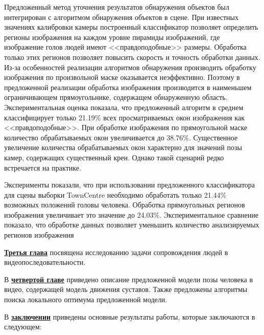 Предложенный метод уточнения результатов обнаружения объектов был интегрирован с алгоритмом обнаружения объектов в сцене. При известных значениях калибровки камеры построенный классификатор позволяет определить регионы изображения на каждом уровне пирамиды изображений, где изображение голов людей имеют <<правдоподобные>> размеры. Обработка только этих регионов позволяет повысить скорость и точность обработки данных. Из-за особенностей реализации алгоритмов обнаружения производить обработку изображения по произвольной маске оказывается неэффективно. Поэтому в предложенной реализации обработка изображения производится в наименьшем ограничивающем прямоугольнике, содержащем обнаруженную область. Экспериментальная оценка показала, что предложенный алгоритм в среднем классифицирует только 21.19\% всех просматриваемых окон изображения как <<правдоподобные>>. При обработке изображения по прямоугольной маске количество обрабатываемых окон увеличивается до 38.76\%. Существенное увеличение количества обрабатываемых окон характерно для значений позы камер, содержащих существенный крен. Однако такой сценарий редко встречается на практике.

Эксперименты показали, что при использовании предложенного классификатора для сцены выборки TownCentre \cite{benfold2011stable} необходимо обработать только 21.44\% возможных положений головы человека. Обработка прямоугольных регионов изображения увеличивает это значение до 24.03\%. Экспериментальное сравнение показало, что  обработке данных позволяет уменьшить количество анализируемых регионов изображения 

\underline{\textbf{Третья глава}} посвящена исследованию задачи сопровождения людей в видеопоследовательности.

В \underline{\textbf{четвертой главе}} приведено описание предложенной модели позы человека в видео, содержащей модель движения суставов. Также предложены алгоритмы поиска локального оптимума предложенной модели.

В \underline{\textbf{заключении}} приведены основные результаты работы, которые заключаются в следующем:


\iffalse
При использовании пакета \verb!biblatex! список публикаций автора по теме
диссертации формируется в разделе <<\publications>>\ файла
\verb!../common/characteristic.tex!  при помощи команды \verb!\nocite! 
\fi


